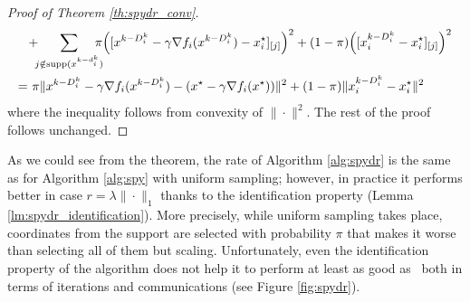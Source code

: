 {\begin{proof}[Proof of Theorem \ref{th:spydr_conv}]
\begin{align*}
  &\!\!\!  + \!\!\!\sum_{j\notin  \supp({{x}^{k-d_i^k}})}\!\!\!\!\!\pi\Big( [{x}^{k-D_i^k} - \gamma \nabla f_i({x}^{k-D_i^k} )  -  {x}_i^{\star}]_{[j]}\Big)^2  + (1-\pi) \Big( [x_{i}^{k-D_i^k}  -  {x}_{i}^{\star}]_{[j]} \Big)^2\\
 =~& \pi \| x^{k-D_i^k} - \gamma \nabla f_i(x^{k-D_i^k})  - (  {x}^{\star} - \gamma \nabla f_i(x^\star) ) \|^2  + (1-\pi) \| x_{i}^{k-D_i^k} - {x}_{i}^{\star}\|^2 
\end{align*}
where the inequality follows from convexity of $\|\cdot\|^2$.
The rest of the proof follows unchanged.
\end{proof}
As we could see from the theorem, the rate of Algorithm \ref{alg:spydr} is the same as for Algorithm \ref{alg:spy} with uniform sampling; however, in practice it performs better in case $r = \lambda\|\cdot\|_1$ thanks to the identification property (Lemma \ref{lm:spydr_identification}). More precisely, while uniform sampling takes place, coordinates from the support are selected with probability $\pi$ that makes it worse than selecting all of them but scaling. Unfortunately, even the identification property of the \spydr algorithm does not help it to perform at least as good as \dave~both in terms of iterations and communications (see Figure \ref{fig:spydr}). 

}
